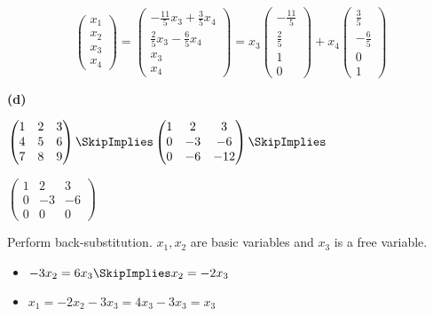 \documentclass[oneside,12pt]{amsart}
\begin{document}
$$
\begin{pmatrix}
 x_1 \\ x_2 \\ x_3 \\ x_4
\end{pmatrix}
=
\begin{pmatrix}
 -\frac{11}{5} x_3 +\frac{3}{5} x_4 \\ \frac{2}{5} x_3 - \frac{6}{5} x_4 \\ x_3 \\ x_4
\end{pmatrix}
=
x_3
\begin{pmatrix}
-\frac{11}{5}  \\ \frac{2}{5} \\ 1 \\ 0
\end{pmatrix}
+
x_4
\begin{pmatrix}
\frac{3}{5}   \\ - \frac{6}{5} \\ 0 \\ 1
\end{pmatrix}
$$


\bigskip

\textbf{(d)}

\bigskip

$
\begin{pmatrix}
1 & 2 & 3 \\
4 & 5 & 6 \\
7 & 8 & 9
\end{pmatrix}
\SkipImplies
\begin{pmatrix}
1 & 2 & 3    \\
0 & -3 & -6  \\
0 & -6 & -12
\end{pmatrix}
\SkipImplies
$

\bigskip

$
\begin{pmatrix}
1 &  2 & 3    \\
0 & -3 & -6  \\
0 &  0 & 0
\end{pmatrix}
$

\bigskip

Perform back-substitution. $x_1,x_2$ are basic variables and $x_3$ is a
free variable.

\begin{itemize}
\item $-3x_2 = 6x_3  \SkipImplies x_2 = -2x_3$
\item $x_1 = -2x_2 - 3x_3 = 4x_3 - 3x_3 = x_3$
\end{itemize}
\end{document}
